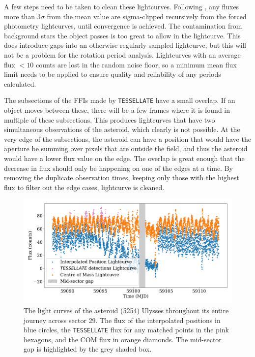 \documentclass{UCreport}
\begin{document}
A few steps need to be taken to clean these lightcurves.
Following \citet{McNeill2023}, any fluxes more than $3\sigma$ from the mean value are sigma-clipped recursively from the forced photometry lightcurves, until convergence is achieved.
The contamination from background stars the object passes is too great to allow in the lightcurve.
This does introduce gaps into an otherwise regularly sampled lightcurve, but this will not be a problem for the rotation period analysis.
Lightcurves with an average flux $<10$ counts are lost in the random noise floor, so a minimum mean flux limit needs to be applied to ensure quality and reliability of any periods calculated.

The subsections of the FFIs made by \texttt{TESSELLATE} have a small overlap.
If an object moves between these, there will be a few frames where it is found in multiple of these subsections.
This produces lightcurves that have two simultaneous observations of the asteroid, which clearly is not possible.
At the very edge of the subsections, the asteroid can have a position that would have the aperture be summing over pixels that are outside the field, and thus the asteroid would have a lower flux value on the edge.
The overlap is great enough that the decrease in flux should only be happening on one of the edges at a time.
By removing the duplicate observation times, keeping only those with the highest flux to filter out the edge cases, lightcurve is cleaned. 

\begin{figure}
  \centering
  \includegraphics[width =\textwidth]{./Figures/SingleBodyLCUlyssesgapSpan.pdf}
  \caption[Lightcurve Example]{The light curves of the asteroid (5254) Ulysses throughout its entire journey across sector 29.
    The flux of the interpolated positions in blue circles, the \texttt{TESSELLATE} flux for any matched points in the pink hexagons, and the COM flux in orange diamonds.
    The mid-sector gap is highlighted by the grey shaded box.}
  \label{Fig:FullSingleLC}
\end{figure}
\end{document}
